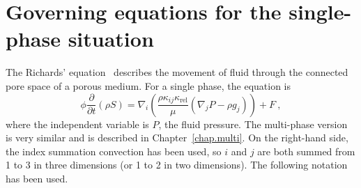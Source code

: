 \documentclass[]{scrreprt}
\begin{document}
\chapter{Governing equations for the single-phase situation}
\label{chap.govern.eqn}
The Richards' equation~\cite{richards1931} describes the movement of
fluid through the connected pore space of a porous medium.  For a
single phase, the equation is
\begin{equation}
\phi \frac{\partial}{\partial t} \left( \rho S \right) = \nabla_{i}
\left( \frac{\rho \kappa_{ij}\kappa_{\mathrm{rel}}}{\mu} (\nabla_{j}P - \rho g_{j}) \right)
+ F \ ,
\label{richards.eqn}
\end{equation}
where the independent variable is $P$, the fluid pressure.  The
multi-phase version is very similar and is described in
Chapter~\ref{chap.multi}.  On the
right-hand side, the index summation convection has been used, so $i$
and $j$ are both summed from 1 to 3 in three dimensions (or 1 to 2 in
two dimensions).  The following notation has been used.
\end{document}
